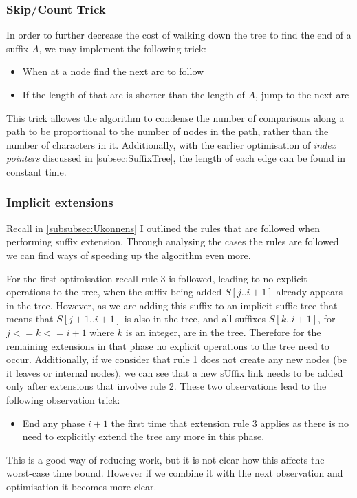 \documentclass[12pt,twoside,notitlepage]{report}
\begin{document}
					\subsubsection{Skip/Count Trick}
					In order to further decrease the cost of walking down the tree to find the end of a suffix $A$, we may implement the following trick:
					\begin{itemize}
						\item{When at a node find the next arc to follow}
						\item{If the length of that arc is shorter than the length of $A$, jump to the next arc}
					\end{itemize}
					
					This trick allowes the algorithm to condense the number of comparisons along a path to be proportional to the number of nodes in the path, rather than the number of characters in it. Additionally, with the earlier optimisation of \emph{index pointers} discussed in \ref{subsec:SuffixTree}, the length of each edge can be found in constant time.
					
					
					\subsubsection{Implicit extensions}
					Recall in \ref{subsubsec:Ukonnens} I outlined the rules that are followed when performing suffix extension. Through analysing the cases the rules are followed we can find ways of speeding up the algorithm even more.
					
					
					For the first optimisation recall rule 3 is followed, leading to no explicit operations to the tree, when the suffix being added $S[j..i+1]$ already appears in the tree. However, as we are adding this suffix to an implicit suffic tree that means that $S[j+1..i+1]$ is also in the tree, and all suffixes $S[k..i+1]$, for $j<=k<=i+1$ where $k$ is an integer, are in the tree. Therefore for the remaining extensions in that phase no explicit operations to the tree need to occur. Additionally, if we consider that rule 1 does not create any new nodes (be it leaves or internal nodes), we can see that a new sUffix link needs to be added only after extensions that involve rule 2. These two observations lead to the following observation trick:
					\begin{itemize}
						\item{End any phase $i+1$ the first time that extension rule 3 applies as there is no need to explicitly extend the tree any more in this phase.}
					\end{itemize}
					This is a good way of reducing work, but it is not clear how this affects the worst-case time bound. However if we combine it with the next observation and optimisation it becomes more clear.
					
\end{document}
